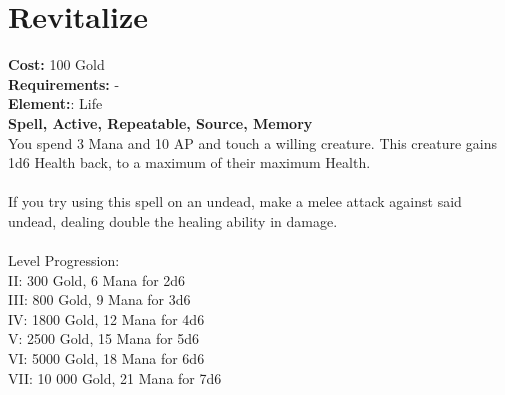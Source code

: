 \section*{Revitalize}
\textbf{Cost:} 100 Gold\\
\textbf{Requirements:} -\\
\textbf{Element:}: Life\\
\textbf{Spell, Active, Repeatable, Source, Memory}\\
You spend 3 Mana and 10 AP and touch a willing creature. This creature gains 1d6 Health back, to a maximum of their maximum Health.\\
\\
If you try using this spell on an undead, make a melee attack against said undead, dealing double the healing ability in damage.\\
\\
Level Progression:\\
II: 300 Gold, 6 Mana for 2d6\\
III: 800 Gold, 9 Mana for 3d6\\
IV: 1800 Gold, 12 Mana for 4d6\\
V: 2500 Gold, 15 Mana for 5d6\\
VI: 5000 Gold, 18 Mana for 6d6\\
VII: 10 000 Gold, 21 Mana for 7d6\\